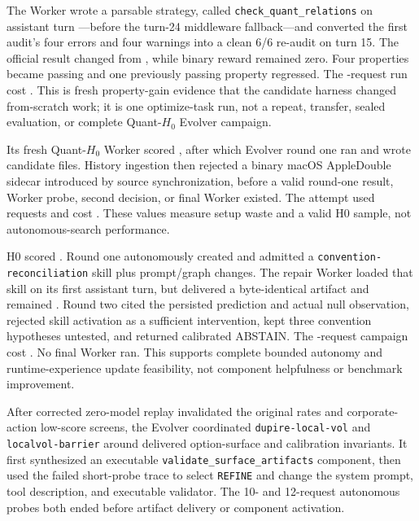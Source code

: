  The Worker wrote a parsable strategy, called
\texttt{check\_quant\_relations} on assistant turn
\QDRFreshFirstTurn{}---before the turn-24 middleware fallback---and converted
the first audit's four errors and four warnings into a clean 6/6 re-audit on
turn 15. The official result changed from \QDRFreshScore{}, while binary reward
remained zero. Four properties became passing and one previously passing
property regressed. The \QDRFreshRequests{}-request run cost
\QDRFreshCost{}. This is fresh property-gain evidence that the candidate
harness changed from-scratch work; it is one optimize-task run, not a repeat,
transfer, sealed evaluation, or complete Quant-$H_0$ Evolver campaign.

 Its fresh
Quant-$H_0$ Worker scored \APThreeRfourHZero{}, after which Evolver round one
ran and wrote candidate files. History ingestion then rejected a binary macOS
AppleDouble sidecar introduced by source synchronization, before a valid
round-one result, Worker probe, second decision, or final Worker existed. The
attempt used \APThreeRfourRequests{} requests and cost
\APThreeRfourCost{}. These values measure setup waste and a valid H0 sample,
not autonomous-search performance.

 H0 scored \APThreeRfiveHZero{}. Round one autonomously
created and admitted a
\texttt{convention-reconciliation} skill plus prompt/graph changes. The repair
Worker loaded that skill on its first assistant turn, but delivered a
byte-identical artifact and remained \APThreeRfiveProbe{}. Round two cited the
persisted prediction and actual null observation, rejected skill activation as
a sufficient intervention, kept three convention hypotheses untested, and
returned calibrated ABSTAIN. The \APThreeRfiveRequests{}-request campaign cost
\APThreeRfiveCost{}. No final Worker ran. This supports complete bounded
autonomy and runtime-experience update feasibility, not component helpfulness
or benchmark improvement.

 After corrected zero-model replay invalidated the original
rates and corporate-action low-score screens, the Evolver coordinated
\texttt{dupire-local-vol} and \texttt{localvol-barrier} around delivered option-surface and
calibration invariants. It first synthesized an executable
\texttt{validate\_surface\_artifacts} component, then used the failed short-probe
trace to select \texttt{REFINE} and change the system prompt, tool description,
and executable validator. The 10- and 12-request autonomous probes both ended
before artifact delivery or component activation.

